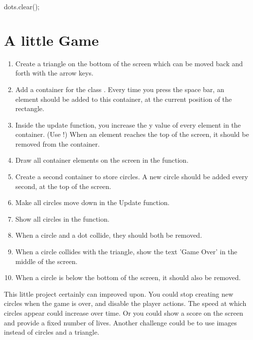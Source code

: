 \begin{code}
dots.clear();
\end{code}

\section{A little Game}

\begin{enumerate}
\item Create a triangle on the bottom of the screen which can be moved back and forth with the arrow keys.
\item Add a container for the class . Every time you press the space bar, an element should be added to this container, at the current position of the rectangle.
\item Inside the update function, you increase the y value of every element in the container. (Use !) When an element reaches the top of the screen, it should be removed from the container.
\item Draw all container elements on the screen in the  function.
\item Create a second container to store circles. A new circle should be added every second, at the top of the screen.
\item Make all circles move down in the Update function.
\item Show all circles in the  function.
\item When a circle and a dot collide, they should both be removed.
\item When a circle collides with the triangle, show the text 'Game Over' in the middle of the screen.
\item When a circle is below the bottom of the screen, it should also be removed.
\end{enumerate}

This little project certainly can improved upon. You could stop creating new circles when the game is over, and disable the player actions. The speed at which circles appear could increase over time. Or you could show a score on the screen and provide a fixed number of lives. Another challenge could be to use images instead of circles and a triangle.

